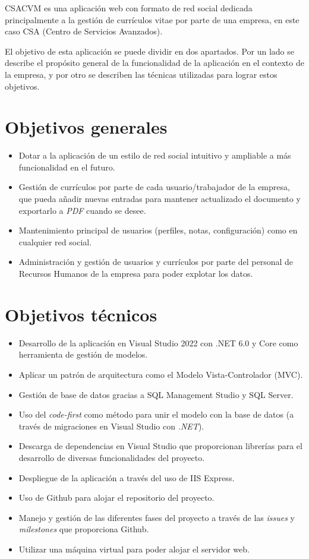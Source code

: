 CSACVM es una aplicación web con formato de red social dedicada principalmente a la gestión de currículos vitae por parte de una empresa, en este caso CSA (Centro de Servicios Avanzados).

El objetivo de esta aplicación se puede dividir en dos apartados. Por un lado se describe el propósito general de la funcionalidad de la aplicación en el contexto de la empresa, y por otro se describen las técnicas utilizadas para lograr estos objetivos.

\section{Objetivos generales}
\begin{itemize}
 \item Dotar a la aplicación de un estilo de red social intuitivo y ampliable a más funcionalidad en el futuro.
 \item Gestión de currículos por parte de cada usuario/trabajador de la empresa, que pueda añadir nuevas entradas para mantener actualizado el documento y exportarlo a \emph{PDF} cuando se desee.
 \item Mantenimiento principal de usuarios (perfiles, notas, configuración) como en cualquier red social.
 \item Administración y gestión de usuarios y currículos por parte del personal de Recursos Humanos de la empresa para poder explotar los datos.
\end{itemize}

\section{Objetivos técnicos}
\begin{itemize}
 \item Desarrollo de la aplicación en Visual Studio 2022 con .NET 6.0 y Core como herramienta de gestión de modelos.
 \item Aplicar un patrón de arquitectura como el Modelo Vista-Controlador (MVC).
 \item Gestión de base de datos gracias a SQL Management Studio y SQL Server.
 \item Uso del \emph{code-first} como método para unir el modelo con la base de datos (a través de migraciones en Visual Studio con \emph{.NET}).
 \item Descarga de dependencias en Visual Studio que proporcionan librerías para el desarrollo de diversas funcionalidades del proyecto.
 \item Despliegue de la aplicación a través del uso de IIS Express.
 \item Uso de Github para alojar el repositorio del proyecto.
 \item Manejo y gestión de las diferentes fases del proyecto a través de las \emph{issues} y \emph{milestones} que proporciona Github.
 \item Utilizar una máquina virtual para poder alojar el servidor web.
\end{itemize}